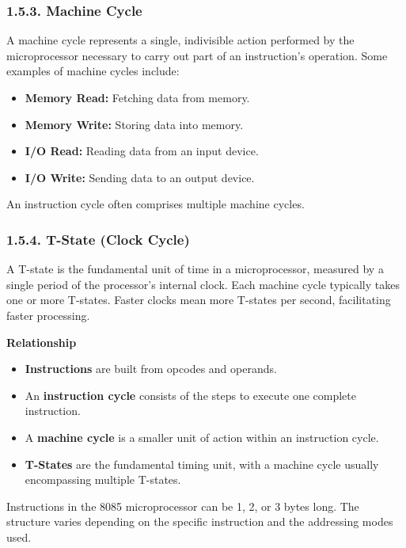 \documentclass[
]{article}
\begin{document}
\hypertarget{153-machine-cycle}{%
\subsubsection{1.5.3. Machine Cycle}\label{153-machine-cycle}}

A machine cycle represents a single, indivisible action performed by the
microprocessor necessary to carry out part of an instruction's
operation. Some examples of machine cycles include:

\begin{itemize}
\item
  \textbf{Memory Read:} Fetching data from memory.
\item
  \textbf{Memory Write:} Storing data into memory.
\item
  \textbf{I/O Read:} Reading data from an input device.
\item
  \textbf{I/O Write:} Sending data to an output device.
\end{itemize}

An instruction cycle often comprises multiple machine cycles.

\hypertarget{154-t-state-clock-cycle}{%
\subsubsection{1.5.4. T-State (Clock
Cycle)}\label{154-t-state-clock-cycle}}

A T-state is the fundamental unit of time in a microprocessor, measured
by a single period of the processor's internal clock. Each machine cycle
typically takes one or more T-states. Faster clocks mean more T-states
per second, facilitating faster processing.

\textbf{Relationship}

\begin{itemize}
\item
  \textbf{Instructions} are built from opcodes and operands.
\item
  An \textbf{instruction cycle} consists of the steps to execute one
  complete instruction.
\item
  A \textbf{machine cycle} is a smaller unit of action within an
  instruction cycle.
\item
  \textbf{T-States} are the fundamental timing unit, with a machine
  cycle usually encompassing multiple T-states.
\end{itemize}

Instructions in the 8085 microprocessor can be 1, 2, or 3 bytes long.
The structure varies depending on the specific instruction and the
addressing modes used.
\end{document}
